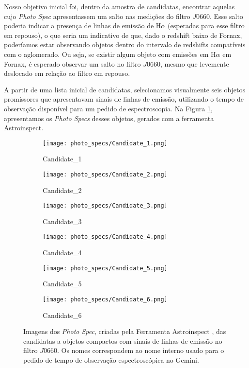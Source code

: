 Nosso objetivo inicial foi, dentro da amostra de candidatas, encontrar aquelas cujo \textit{Photo Spec} apresentassem um salto nas medições do filtro $J0660$. Esse salto poderia indicar a presença de linhas de emissão de H$\alpha$ (esperadas para esse filtro em repouso), o que seria um indicativo de que, dado o redshift baixo de Fornax, poderíamos estar observando objetos dentro do intervalo de redshifts compatíveis com o aglomerado. Ou seja, se existir algum objeto com emissões em H$\alpha$ em Fornax, é esperado observar um salto no filtro $J0660$, mesmo que levemente deslocado em relação ao filtro em repouso.

A partir de uma lista inicial de candidatas, selecionamos visualmente seis objetos promissores que apresentavam sinais de linhas de emissão, utilizando o tempo de observação disponível para um pedido de espectroscopia. Na Figura \ref{photo_spec_candidatas}, apresentamos os \textit{Photo Specs} desses objetos, gerados com a ferramenta Astroinspect.

\begin{figure}[!ht]
    \centering
    \captionsetup{justification=centering}
    \begin{subfigure}[b]{0.3\textwidth}
        \texttt{[image: photo\_specs/Candidate\_1.png]}
        \caption{Candidate\_1}
    \end{subfigure}
    \begin{subfigure}[b]{0.3\textwidth}
        \texttt{[image: photo\_specs/Candidate\_2.png]}
        \caption{Candidate\_2}
    \end{subfigure}
    \begin{subfigure}[b]{0.3\textwidth}
        \texttt{[image: photo\_specs/Candidate\_3.png]}
        \caption{Candidate\_3}
    \end{subfigure}
    \begin{subfigure}[b]{0.3\textwidth}
        \texttt{[image: photo\_specs/Candidate\_4.png]}
        \caption{Candidate\_4}
    \end{subfigure}
    \begin{subfigure}[b]{0.3\textwidth}
        \texttt{[image: photo\_specs/Candidate\_5.png]}
        \caption{Candidate\_5}
    \end{subfigure}
    \begin{subfigure}[b]{0.3\textwidth}
        \texttt{[image: photo\_specs/Candidate\_6.png]}
        \caption{Candidate\_6}
    \end{subfigure}
    \caption{Imagens dos \textit{Photo Spec}, criadas pela Ferramenta Astroinspect \cite{astroinspect}, das candidatas a objetos compactos com sinais de linhas de emissão no filtro $J0660$. Os nomes correspondem ao nome interno usado para o pedido de tempo de observação espectroscópica no Gemini.}
    \label{photo_spec_candidatas}
\end{figure}

